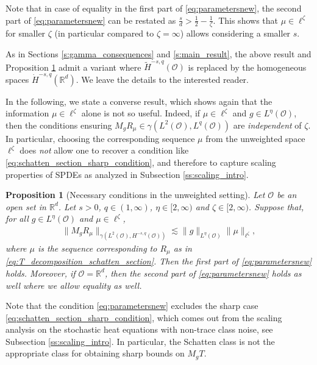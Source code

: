 \documentclass[reqno]{amsart}
\theoremstyle{plain}
\theoremstyle{remark}
\theoremstyle{plain}
\newtheorem{proposition}[theorem]{Proposition}
\numberwithin{equation}{section}
\newcommand\cO{\mathcal{O}}
\def\R{{\mathbb R}}
\newcommand{\g}{\gamma}
\newcommand{\Domm}{\mathcal{O}}
\newcommand{\wt}{\widetilde}
\newcommand{\1}{\one}
\begin{document}
Note that in case of equality in  the first part of \eqref{eq:parametersnew}, the second part of \eqref{eq:parametersnew} can be restated as $\frac{s}{d}>\frac{1}{2} - \frac{1}{\zeta}$. This shows that $\mu \in \ell^\zeta$ for smaller $\zeta$ (in particular compared to $\zeta = \infty$) allows considering a smaller $s$.

\smallskip

As in Sections \ref{s:gamma_consequences} and \ref{s:main_result}, the above result and Proposition \ref{p:necessary_schatten} admit a variant where $\wt{H}^{-s,q}(\Domm)$ is replaced by the homogeneous spaces $\dot{H}^{-s,q}(\R^d)$. We leave the details to the interested reader.


\smallskip

In the following, we state a converse result, which shows again that the information $\mu\in\ell^\zeta$ alone is not so useful. Indeed,
if $\mu\in\ell^\zeta$ and $g\in L^\eta(\Domm)$, then the conditions ensuring $M_g R_{\mu}\in \g(L^2(\Domm),L^q(\Domm))$ are \emph{independent} of $\zeta$. In particular, choosing the corresponding sequence $\mu$ from the unweighted space $\ell^\zeta$ does \emph{not} allow one to recover a condition like \eqref{eq:schatten_section_sharp_condition}, and therefore to capture scaling properties of SPDEs as analyzed in Subsection \ref{ss:scaling_intro}.



\begin{proposition}[Necessary conditions in the unweighted setting]
\label{p:necessary_schatten}
Let $\Domm$ be an open set in $\R^d$.
    Let $s>0$, $q\in(1,\infty)$, $\eta\in [2,\infty)$ and $\zeta\in [2,\infty)$. Suppose that, for all $g\in L^\eta(\cO)$ and $\mu\in \ell^\zeta$,
    \begin{align}
    \label{eq: necessity 2 parameters general ONB}
        \|M_gR_{\mu}\|_{\gamma(L^2(\cO),H^{-s,q}(\cO))}
        \lesssim \|g\|_{L^\eta(\mathcal{O})} \|\mu\|_{\ell^\zeta},
	 \end{align}
	 where $\mu$ is the sequence corresponding to $R_{\mu}$ as in \eqref{eq:T_decomposition_schatten_section}.
    Then the first part of \eqref{eq:parametersnew} holds.  
    Moreover, if $\Domm=\R^d$, then the second part of \eqref{eq:parametersnew} holds as well where we allow equality as well. 
\end{proposition}



Note that the condition \eqref{eq:parametersnew} excludes the sharp case \eqref{eq:schatten_section_sharp_condition}, which comes out from the scaling analysis on the stochastic heat equations with non-trace class noise, see Subsection \ref{ss:scaling_intro}. In particular, the Schatten class is not the appropriate class for obtaining sharp bounds on $M_g T $.
\end{document}
